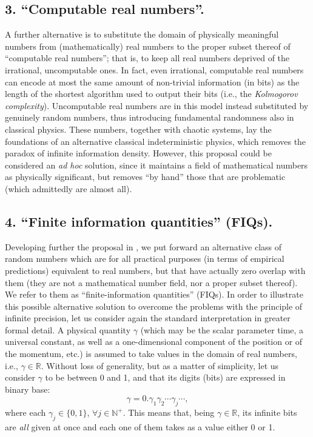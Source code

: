 \documentclass[aps,prl,twocolumn,showpacs,superscriptaddress,groupedaddress, nofootinbib]{revtex4-1}
\newcommand{\R}{\mathbb{R}}
\newcommand{\N}{\mathbb{N}}
\begin{document}
\subsection{3. ``Computable real numbers''.}
A further alternative is to substitute the domain of physically meaningful numbers from (mathematically) real numbers to the proper subset thereof of ``computable real numbers''; that is, to keep all real numbers deprived of  the irrational, uncomputable ones. In fact, even irrational, computable real numbers can encode at most the same amount of non-trivial information (in bits) as the length of the shortest algorithm used to output their bits (i.e., the \emph{Kolmogorov complexity}). Uncomputable real numbers are in this model instead substituted by genuinely random numbers, thus introducing fundamental randomness also in classical physics. These numbers, together with chaotic systems, lay the foundations of an alternative classical indeterministic physics, which removes the paradox of infinite information density. However, this proposal could be considered an \emph{ad hoc} solution, since it maintains a field of mathematical numbers as physically significant, but removes ``by hand'' those that are problematic (which admittedly are almost all).

\subsection{4. ``Finite information quantities'' (FIQs).} 
Developing further the proposal in \cite{gisin1}, we put forward an alternative class of random numbers which are for all practical purposes (in terms of empirical predictions) equivalent to real numbers, but that have actually zero overlap with them (they are not a mathematical number field, nor a proper subset thereof). We refer to them as ``finite-information quantities'' (FIQs). In order to illustrate this possible alternative solution to overcome the problems with the principle of infinite precision, let us consider again the standard interpretation in greater formal detail. A physical quantity $\gamma$ (which may be the scalar parameter time, a universal constant, as well as a one-dimensional component of the position or of the momentum, etc.) is assumed to take values in the domain of real numbers, i.e., $\gamma \in \R$. Without loss of generality, but as a matter of simplicity, let us consider $\gamma$ to be between 0 and 1, and that its digits (bits) are expressed in binary base:
%
\begin{equation*}
\gamma=0.\gamma_1\gamma_2\cdots \gamma_j \cdots,
\end{equation*}
%
where each $\gamma_j\in\{0,1\}$, $\forall j\in \N^+$. This means that, being $\gamma \in \R$, its infinite bits are \emph{all} given at once and each one of them takes as a value either 0 or 1. 
\end{document}
